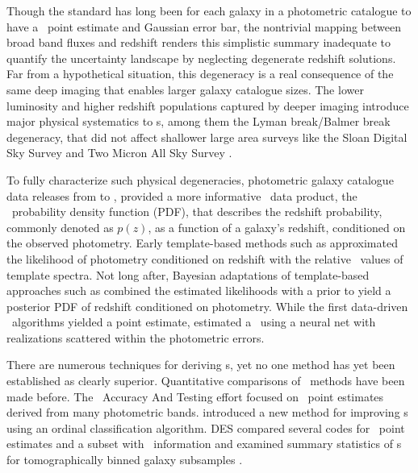 Though the standard has long been for each galaxy in a photometric catalogue to have a \pz\ point estimate and Gaussian error bar, the nontrivial mapping between broad band fluxes and redshift renders this simplistic summary inadequate to quantify the uncertainty landscape by neglecting degenerate redshift solutions.
Far from a hypothetical situation, this degeneracy is a real consequence of the same deep imaging that enables larger galaxy catalogue sizes.
The lower luminosity and higher redshift populations captured by deeper imaging introduce major physical systematics to \pz s, among them the Lyman break/Balmer break degeneracy, that did not affect shallower large area surveys like the Sloan Digital Sky Survey \citep[\textsc{SDSS},][]{York:00} and Two Micron All Sky Survey \citep[\textsc{2MASS},][]{Skrutskie:06}.

To fully characterize such physical degeneracies, photometric galaxy catalogue data releases from \citep{Mandelbaum:2008} to \citep{de_Jong:17}, provided a more informative \pz\ data product, the \pz\ probability density function (PDF), that describes the redshift probability, commonly denoted as $p(z)$, as a function of a galaxy's redshift, conditioned on the observed photometry.
Early template-based methods such as \citet{Fernandezsoto:99} approximated the likelihood of photometry conditioned on redshift with the relative \chisq\ values of template spectra.
Not long after, Bayesian adaptations of template-based approaches such as \citet{Benitez:00} combined the estimated likelihoods with a prior to yield a posterior PDF of redshift conditioned on photometry.
While the first data-driven \pz\ algorithms yielded a point estimate, \citet{Firth:03} estimated a \pzpdf\ using a neural net with realizations scattered within the photometric errors.

There are numerous techniques for deriving \pzpdf s, yet no one method has yet been established as clearly superior.
Quantitative comparisons of \pz\ methods have been made before.
The \Pz\ Accuracy And Testing \citep[\textsc{PHAT},][]{Hildebrandt:10} effort focused on \pz\ point estimates derived from many photometric bands.
\citet{Rau:2015} introduced a new method for improving \pzpdf s using an ordinal classification algorithm.
\textsc{DES} compared several codes for \pz\ point estimates and a subset with \pzpdf\ information \citep{Sanchez:14} and examined summary statistics of \pzpdf s for tomographically binned galaxy subsamples \citep{Bonnett:16}.

